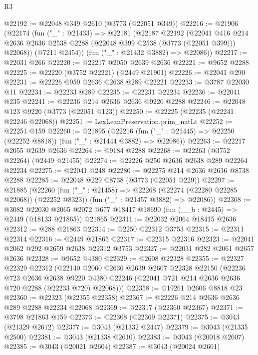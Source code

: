 \begin{lexlean}{R3}
\begin{coremodule}
@22192 := @22048 @349 @2610 (@3773 (@22051 @349))
@22216 := @21906
    (@22174
      (fun ("_" : @21433) =>
      @22181
        (@22187
          @22192
          (@22041
            @416
            @214
            @2636
            @2636
            @2538
            @2288
            (@22048 @399 @2538 (@3773 (@22051 @399)))
            @22068))
        (@7211 @2454))
      (fun ("_" : @21432 @3882) => @22086))
@22217 := @22031 @266
@22220 := @22217 @2050 @2639 @2636
@22221 := @9652 @2288
@22225 := @22220 (@3752 @22221) (@2449 @21901)
@22226 := @22041 @290
@22231 := @22226 @959 @2636 @2638 @289 @22221
@22233 := @3787 @22030 @11
@22234 := @22233 @289
@22235 := @22231 @22234
@22236 := @22041 @235
@22241 := @22236 @214 @2636 @2636 @9220 @2288
@22246 := @22048 @123 @9220 (@3773 (@22051 @123))
@22250 := @22225 (@22235 (@22241 @22246 @22068))
@22251 := LexLeanPreservation.prim_natLt
@22252 := @22251 @159
@22260 := @21895
    (@22216 (fun ("_" : @21445) => @22250 (@22252 @8818)) (fun ("_" : @21444 @3882) => @22086))
@22263 := @22217 @2055 @2639 @2636
@22264 := @9184 @2288
@22268 := @22263 (@3752 @22264) (@2449 @21455)
@22274 := @22226 @250 @2636 @2638 @289 @22264 @22234
@22275 := @22041 @248
@22280 := @22275 @214 @2636 @2636 @8738 @2288
@22285 := @22048 @229 @8738 (@3773 (@22051 @229))
@22297 := @21885
    (@22260
      (fun ("_" : @21458) => @22268 (@22274 (@22280 @22285 @22068)) (@22252 @8323))
      (fun ("_" : @21457 @3882) => @22086))
@22308 := @3082
    @22030
    @2065
    @2072
    @677
    @18417
    @18690
    (fun (__b : @2445) => @2449 (@18133 @21865))
    @21865
@22311 := @22032 @2064 @18415 @2636
@22312 := @288 @21863
@22314 := @2250 @22312 @3753
@22315 := @22311 @22314
@22316 := @2449 @21865
@22317 := @22315 @22316
@22323 := @22041 @2062 @292 @2659 @2638 @22312 @3753
@22327 := @22031 @282 @2061 @2657 @2636
@22328 := @9652 @4380
@22329 := @2608 @22328
@22355 := @22327
    @22329
    @22312
    (@22140
      @2060
      @2636
      @2639
      @2607
      @22328
      @22150
      (@22236
        @723
        @2636
        @2638
        @9220
        @4380
        @22246
        (@22041 @721 @214 @2636 @2636 @720 @2288 (@22233 @720) @22068)))
@22358 := @19261 @2606 @8818 @23
@22360 := @22323 (@22355 @22358)
@22367 := @22226 @214 @2636 @2636 @289 @2288 @22234 @22068
@22369 := @22317 (@22360 @22367)
@22371 := @3798 @21863 @159
@22373 := @22308 (@22369 @22371)
@22375 := @3043 (@21329 @2612)
@22377 := @3043 (@21332 @2447)
@22379 := @3043 (@21335 @2500)
@22381 := @3043 (@21338 @2610)
@22383 := @3043 (@20018 @2607)
@22385 := @3043 (@20021 @2604)
@22387 := @3043 (@20024 @2601)

\end{coremodule}
\end{lexlean}
